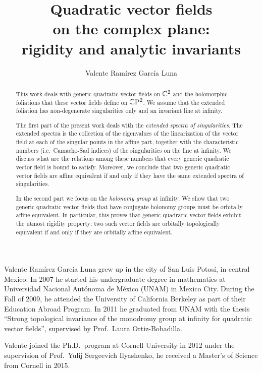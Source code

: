 \documentclass[phd,tocprelim]{cornell}
\title {Quadratic vector fields\\on the complex plane:\\rigidity and analytic invariants}
\author {Valente Ram\'{i}rez Garc\'{i}a Luna}
\begin{document}
\setcounter{page}{-3} %
\maketitle
\makecopyright

\cleardoublepage{} %
\begin{abstract}
 This work deals with generic quadratic vector fields on $\mathbb{C}^2$ and the holomorphic foliations that these vector fields define on $\mathbb{C}\mathrm{P}^2$. We assume that the extended foliation has non-degenerate singularities only and an invariant line at infinity.
 
 The first part of the present work deals with the \textit{extended spectra of singularities}. The extended spectra is the collection of the eigenvalues of the linearization of the vector field at each of the singular points in the affine part, together with the characteristic numbers (i.e.~Camacho-Sad indices) of the singularities on the line at infinity. We discuss what are the relations among these numbers that every generic quadratic vector field is bound to satisfy. Moreover, we conclude that two generic quadratic vector fields are affine equivalent if and only if they have the same extended spectra of singularities.
 
 In the second part we focus on the \textit{holonomy group} at infinity. We show that two generic quadratic vector fields that have conjugate holonomy groups must be orbitally affine equivalent. In particular, this proves that generic quadratic vector fields exhibit the utmost rigidity property: two such vector fields are orbitally topologically equivalent if and only if they are orbitally affine equivalent.

\begin{metadata} %
 
\end{metadata}
\end{abstract}


\cleardoublepage{}
\begin{biosketch}
Valente Ramírez García Luna grew up in the city of San Luis Potosí, in central Mexico. In 2007 he started his undergraduate degree in mathematics at Universidad Nacional Autónoma de México (UNAM) in Mexico City. During the Fall of 2009, he attended the University of California Berkeley as part of their Education Abroad Program. In 2011 he graduated from UNAM with the thesis ``Strong topological invariance of the monodromy group at infinity for quadratic vector fields'', supervised by Prof.~Laura Ortiz-Bobadilla.

Valente joined the Ph.D.~program at Cornell University in 2012 under the supervision of Prof.~Yulij Sergeevich Ilyashenko, he received a Master's of Science from Cornell in 2015.
\end{biosketch}
\end{document}
